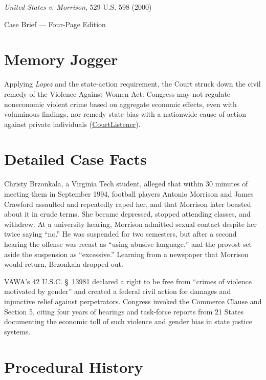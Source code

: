 \documentclass[12pt]{article}
\begin{document}
\begin{center}
{\LARGE \textit{United States v. Morrison}, 529 U.S. 598 (2000)\par}
\vspace{0.8em}
{\large Case Brief --- Four-Page Edition\par}
\end{center}
\vspace{1em}

\section{Memory Jogger}

Applying \textit{Lopez} and the state-action requirement, the Court struck down the civil remedy of the Violence Against Women Act: Congress may not regulate noneconomic violent crime based on aggregate economic effects, even with voluminous findings, nor remedy state bias with a nationwide cause of action against private individuals (\href{https://www.courtlistener.com/opinion/118363/united-states-v-morrison/}{CourtListener}).

\section{Detailed Case Facts}

Christy Brzonkala, a Virginia Tech student, alleged that within 30 minutes of meeting them in September 1994, football players Antonio Morrison and James Crawford assaulted and repeatedly raped her, and that Morrison later boasted about it in crude terms. She became depressed, stopped attending classes, and withdrew. At a university hearing, Morrison admitted sexual contact despite her twice saying ``no.'' He was suspended for two semesters, but after a second hearing the offense was recast as ``using abusive language,'' and the provost set aside the suspension as ``excessive.'' Learning from a newspaper that Morrison would return, Brzonkala dropped out.

VAWA's 42 U.S.C. \S~13981 declared a right to be free from ``crimes of violence motivated by gender'' and created a federal civil action for damages and injunctive relief against perpetrators. Congress invoked the Commerce Clause and Section 5, citing four years of hearings and task-force reports from 21 States documenting the economic toll of such violence and gender bias in state justice systems.

\section{Procedural History}
\end{document}
